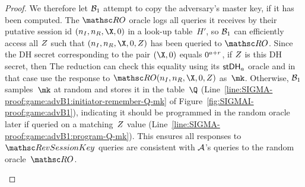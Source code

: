 \begin{proof}
We therefore let $\mathcal{B}_1$ attempt to copy the adversary's master key, if it has been computed.
The $\RO$ oracle logs all queries it receives by their putative session id $(\nonce_I,\nonce_R,\X,\Y)$ in a look-up table~$H'$, so $\mathcal{B}_1$ can efficiently access all $Z$ such that $(\nonce_I,\nonce_R,\X,\Y,\Zz)$ has been queried to $\RO$. 
Since the DH secret corresponding to the pair $(\X,\Y)$ equals $\Y^{a+r}$, if $Z$ is this DH secret, then 
The reduction can check this equality using its $\mathsf{stDH}_a$ oracle and in that case use the response to $\RO(\nonce_I,\nonce_R,\X,\Y,\Zz)$ as~$\mk$.
Otherwise, $\mathcal{B}_1$ samples~$\mk$ at random and stores it in the table~$\Q$ (Line~\ref{line:SIGMA-proof:game:advB1:initiator-remember-Q-mk} of Figure~\ref{fig:SIGMAI-proof:game:advB1}), indicating it should be programmed in the random oracle later if queried on a matching~$Z$ value (Line~\ref{line:SIGMA-proof:game:advB1:program-Q-mk}).
This ensures all responses to $\RevSessionKey$ queries are consistent with $\mathcal{A}$'s queries to the random oracle~$\RO$.

\begin{figure}[tp]
    \begin{minipage}[t]{0.49\textwidth}


\end{minipage}
\end{figure}
\end{proof}
